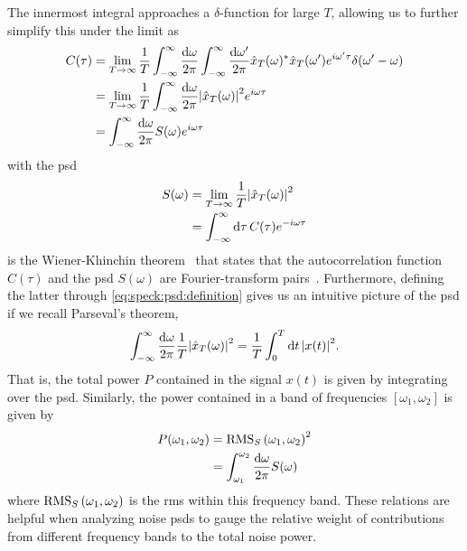 The innermost integral approaches a $\delta$-function for large $T$,
allowing us to further simplify this under the limit as
\begin{align}
    C(\tau) &= \lim_{T\to\infty} \frac{1}{T}\int_{-\infty}^{\infty}\frac{\dd{\omega}}{2\pi}\int_{-\infty}^{\infty}\frac{\dd{\omega^\prime}}{2\pi}
                \hat{x}_T(\omega)^\ast\hat{x}_T(\omega^\prime)
                e^{i\omega^\prime\tau}\delta(\omega^\prime - \omega)\\
            &= \lim_{T\to\infty}\frac{1}{T}
                \int_{-\infty}^{\infty}\frac{\dd{\omega}}{2\pi}\abs{\hat{x}_T(\omega)}^2 e^{i\omega\tau} \\
            &= \int_{-\infty}^{\infty}\frac{\dd{\omega}}{2\pi} S(\omega) e^{i\omega\tau} \label{eq:speck:wiener_khinchin}
\end{align}
with the \acrfull{psd}
\begin{align}
    S(\omega) &= \lim_{T\to\infty}\frac{1}{T}\abs{\hat{x}_T(\omega)}^2 \label{eq:speck:psd:definition}\\
              &= \int_{-\infty}^{\infty}\dd{\tau} C(\tau)e^{-i\omega\tau}
\end{align}
 is the Wiener-Khinchin theorem~\cite{Wiener1930,Khintchine1934} that states that the autocorrelation function $C(\tau)$ and the \gls{psd} $S(\omega)$ are Fourier-transform pairs~\cite{Koopmans1995}.
Furthermore, defining the latter through \cref{eq:speck:psd:definition} gives us an intuitive picture of the \gls{psd} if we recall Parseval's theorem,
\begin{align}\label{eq:speck:parseval}
    \int_{-\infty}^{\infty}\frac{\dd{\omega}}{2\pi}\frac{1}{T}\abs{\hat{x}_T(\omega)}^2 = \frac{1}{T}\int_{0}^{T}\dd{t}\abs{x(t)}^2.
\end{align}
That is, the total power $P$ contained in the signal $x(t)$ is given by integrating over the \gls{psd}.
Similarly, the power contained in a band of frequencies $[\omega_1, \omega_2]$ is given by
\begin{align}
    P(\omega_1, \omega_2) &= \operatorname{RMS}_S\left(\omega_1, \omega_2\right)^2 \label{eq:speck:psd:bandpower}\\
                          &= \int_{\omega_1}^{\omega_2}\frac{\dd{\omega}}{2\pi} S(\omega)
\end{align}
where $\operatorname{RMS}_S\left(\omega_1, \omega_2\right)$ is the \acrlong{rms} within this frequency band.
These relations are helpful when analyzing noise \glspl{psd} to gauge the relative weight of contributions from different frequency bands to the total noise power.

